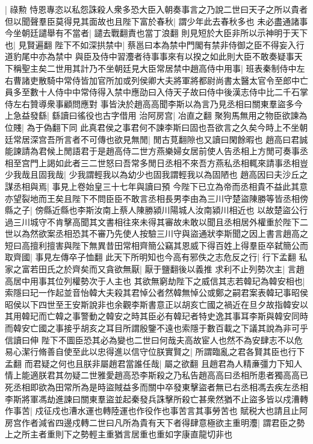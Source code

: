 |{
	祿勲}
恃恩專恣以私怨誅殺人衆多恐大臣入朝奏事言之乃說二世曰天子之所以貴者但以聞聲羣臣莫得見其面故也且陛下富於春秋|{
	謂少年此去春秋多也}
未必盡通諸事今坐朝廷譴舉有不當者|{
	譴去戰翻責也當丁浪翻}
則見短於大臣非所以示神明于天下也|{
	見賢遍翻}
陛下不如深拱禁中|{
	蔡邕曰本為禁中門閣有禁非侍御之臣不得妄入行道豹尾中亦為禁中}
與臣及侍中習灋者待事事來有以揆之如此則大臣不敢奏疑事天下稱聖主矣二世用其計乃不坐朝廷見大臣常居禁中趙高侍中用事|{
	班表秦制侍中左右曹諸吏散騎中常侍皆加官所加或列侯卿大夫將軍將都尉尚書太醫太官令至郎中亡員多至數十人侍中中常侍得入禁中應劭曰入侍天子故曰侍中後漢志侍中比二千石掌侍左右贊導衆事顧問應對}
事皆決於趙高高聞李斯以為言乃見丞相曰關東羣盜多今上急益發繇|{
	繇讀曰徭役也古字借用}
治阿房宫|{
	冶直之翻}
聚狗馬無用之物臣欲諫為位賤|{
	為于偽翻下同}
此真君侯之事君何不諫李斯曰固也吾欲言之久矣今時上不坐朝廷常居深宫吾所言者不可傳也欲見無閒|{
	閒古莧翻隙也又讀曰閑餘暇也}
趙高曰君誠能諫請為君候上閒語君于是趙高侍二世方燕樂婦女居前使人告丞相上方閒可奏事丞相至宫門上謁如此者三二世怒曰吾常多閒日丞相不來吾方燕私丞相輒來請事丞相豈少我哉且固我哉|{
	少我謂輕我以為幼少也固我謂輕我以為固陋也}
趙高因曰夫沙丘之謀丞相與焉|{
	事見上卷始皇三十七年與讀曰預}
今陛下已立為帝而丞相貴不益此其意亦望裂地而王矣且陛下不問臣臣不敢言丞相長男李由為三川守楚盜陳勝等皆丞相傍縣之子|{
	傍縣近縣也李斯汝南上蔡人陳勝潁川陽城人汝南潁川相近也}
以故楚盜公行過三川城守不肯擊高聞其文書相往來未得其審故未敢以聞且丞相居外權重於陛下二世以為然欲案丞相恐其不審乃先使人按驗三川守與盜通狀李斯聞之因上書言趙高之短曰高擅利擅害與陛下無異昔田常相齊簡公竊其恩威下得百姓上得羣臣卒弑簡公而取齊國|{
	事見左傳卒子恤翻}
此天下所明知也今高有邪佚之志危反之行|{
	行下孟翻}
私家之富若田氏之於齊矣而又貪欲無厭|{
	厭于鹽翻後以義推}
求利不止列勢次主|{
	言趙高居中用事其位列權勢次于人主也}
其欲無窮劫陛下之威信其志若韓玘為韓安相也|{
	索隱曰玘一作起並音怡韓大夫殺其君悼公者然韓無悼公或鄭之嗣君案表韓玘事昭侯昭侯以下四世至王安斯說非也余觀李斯書意正以胡亥亡國之禍近在旦夕故指韓安以其用韓玘而亡韓之事警動之韓安之時其臣必有韓玘者特史逸其事耳李斯與韓安同時而韓安亡國之事接乎胡亥之耳目所謂殷鑒不遠也索隱于數百載之下議其說為非可乎信讀曰伸}
陛下不圖臣恐其必為變也二世曰何哉夫高故宦人也然不為安肆志不以危易心潔行脩善自使至此以忠得進以信守位朕實賢之|{
	所謂臨亂之君各賢其臣也行下孟翻}
而君疑之何也且朕非屬趙君當誰任哉|{
	屬之欲翻}
且趙君為人精亷彊力下知人情上能適朕君其勿疑二世雅愛趙高恐李斯殺之乃私告趙高高曰丞相所患者獨高高已死丞相即欲為田常所為是時盜賊益多而關中卒發東擊盜者無已右丞相馮去疾左丞相李斯將軍馮劫進諫曰關東羣盜並起秦發兵誅擊所殺亡甚衆然猶不止盜多皆以戍漕轉作事苦|{
	戍征戍也漕水運也轉陸運也作役作也事苦言其事勞苦也}
賦税大也請且止阿房宫作者減省四邊戍轉二世曰凡所為貴有天下者得肆意極欲主重明灋|{
	謂君臣之勢上之所主者重則下之勢輕主重猶言居重也重如字康直龍切非也}
